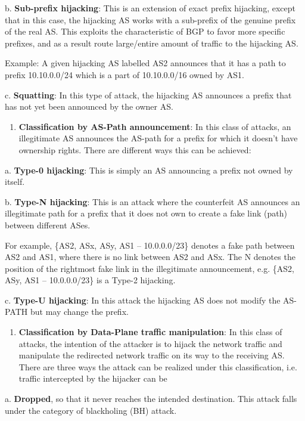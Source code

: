 \documentclass[11pt]{article}
\begin{document}
b. \textbf{Sub-prefix hijacking}: This is an extension of exact prefix hijacking, except that in this case, the hijacking AS works with a sub-prefix of the genuine prefix of the real AS. This exploits the characteristic of BGP to favor more specific prefixes, and as a result route large/entire amount of traffic to the hijacking AS.

Example: A given hijacking AS labelled AS2 announces that it has a path to prefix 10.10.0.0/24 which is a part of 10.10.0.0/16 owned by AS1.

c. \textbf{Squatting}: In this type of attack, the hijacking AS announces a prefix that has not yet been announced by the owner AS.

\begin{enumerate}
\item \textbf{Classification by AS-Path announcement}: In this class of attacks, an illegitimate AS announces the AS-path for a prefix for which it doesn’t have ownership rights. There are different ways this can be achieved:
\end{enumerate}

a. \textbf{Type-0 hijacking}: This is simply an AS announcing a prefix not owned by itself.

b. \textbf{Type-N hijacking}: This is an attack where the counterfeit AS announces an illegitimate path for a prefix that it does not own to create a fake link (path) between different ASes.

For example, \{AS2, ASx, ASy, AS1 – 10.0.0.0/23\} denotes a fake path between AS2 and AS1, where there is no link between AS2 and ASx. The N denotes the position of the rightmost fake link in the illegitimate announcement, e.g. \{AS2, ASy, AS1 – 10.0.0.0/23\} is a Type-2 hijacking.

c. \textbf{Type-U hijacking}: In this attack the hijacking AS does not modify the AS-PATH but may change the prefix.



\begin{enumerate}
\item \textbf{Classification by Data-Plane traffic manipulation}: In this class of attacks, the intention of the attacker is to hijack the network traffic and  manipulate the redirected network traffic on its way to the receiving AS. There are three ways the attack can be realized under this classification, i.e.   traffic intercepted by the hijacker can be
\end{enumerate}

a. \textbf{Dropped}, so that it never reaches the intended destination. This attack falls under the category of blackholing (BH) attack.
\end{document}
